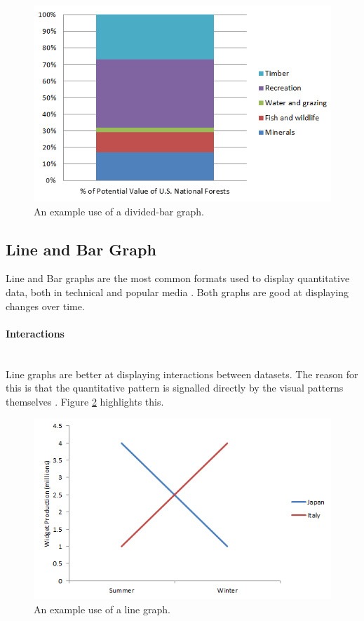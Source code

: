 \begin{figure}[H]
  \centering
    \includegraphics[scale=1]{chapter3/visualisation/divided_bar_graph.png}
  \caption{An example use of a divided-bar graph.}
  \label{fig:dividedbar}
\end{figure}


\subsection{Line and Bar Graph}
Line and Bar graphs are the most common formats used to display quantitative 
data, both in technical and popular media \citep{kosslyn06}. Both graphs are 
good at displaying changes over time.

\paragraph{Interactions} ~\\
Line graphs are better at displaying interactions between datasets. The reason 
for this is that the quantitative pattern is signalled directly by the visual 
patterns themselves \citep{kosslyn06}. Figure \ref{fig:line_bar_interactions}
highlights this.

\begin{figure}[H]
  \centering
    \includegraphics[scale=1]{chapter3/visualisation/line_bar_interactions.png}
  \caption{An example use of a line graph.}
  \label{fig:line_bar_interactions}
\end{figure}


